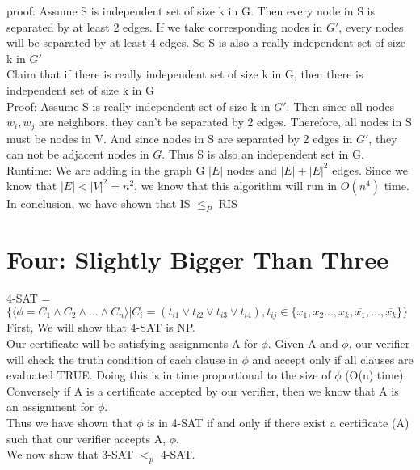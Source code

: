 \documentclass[12pt]{article}
\begin{document}
proof: Assume S is independent set of size k in G. Then every node in S is separated  by at least 2 edges. If we take corresponding nodes in $G'$, every nodes will be separated by at least 4 edges. So S is also a really independent set of size k in $G'$\\

Claim that if  there is really independent set of size k in G, then there is independent set of size k in G\\

Proof: Assume S is really independent set of size k in $G'$. Then since all nodes $w_i, w_j$ are neighbors, they can't be separated by 2 edges. Therefore, all nodes in S must be nodes in V. And since nodes in S are separated by 2 edges in  $G'$, they can not be adjacent nodes in $G$. Thus S is also an independent set in G.\\

Runtime: We are adding in the graph G $|E|$ nodes and  $|E| + |E|^2$ edges. Since we know that $|E| < |V|^2 = n^2$, we know that this algorithm will run in $O(n^4)$ time.\\

In conclusion, we have shown that IS $\le_P$ RIS

\pagebreak


\section{Four: Slightly Bigger Than Three}

4-SAT = $\{\langle\phi = C_1 \wedge C_2 \wedge ... \wedge C_n \rangle | C_i = (t_{i1} \vee t_{i2} \vee t_{i3} \vee t_{i4}  ), t_{ij} \in \{x_1,x_2...,x_k,\overline{x_1},...,\overline{x_k}\}\}$\\

First, We will show that 4-SAT is NP.\\
Our certificate will be satisfying assignments A for $\phi$. Given A and $\phi$, our verifier will check the truth condition of each clause in $\phi$ and accept only if all clauses are evaluated TRUE. Doing this is in time proportional to the size of $\phi$ (O(n) time). Conversely if A is a certificate accepted by our verifier, then we know that A is an assignment for $\phi$.\\
Thus we have shown that $\phi$ is in 4-SAT if and only if there exist a certificate (A) such that our verifier accepts A, $\phi$.\\


We now show that 3-SAT $<_p$ 4-SAT.\\
\end{document}
